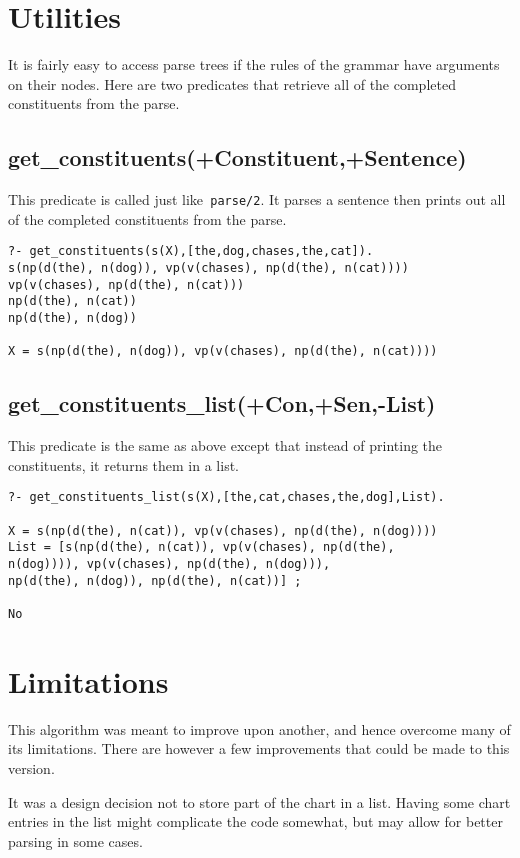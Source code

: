 \documentclass[12pt]{article}
\begin{document}
\section{Utilities}
It is fairly easy to access parse trees if the rules of the grammar have arguments on their nodes.  Here are two predicates that retrieve all of the completed constituents from the parse.

\subsection{get\_constituents(+Constituent,+Sentence)}
This predicate is called just like\verb| parse/2|.  It parses a sentence then prints out all of the completed constituents from the parse.
\begin{verbatim}
?- get_constituents(s(X),[the,dog,chases,the,cat]).
s(np(d(the), n(dog)), vp(v(chases), np(d(the), n(cat))))
vp(v(chases), np(d(the), n(cat)))
np(d(the), n(cat))
np(d(the), n(dog))

X = s(np(d(the), n(dog)), vp(v(chases), np(d(the), n(cat))))
\end{verbatim}

\subsection{get\_constituents\_list(+Con,+Sen,-List)}
This predicate is the same as above except that instead of printing the constituents, it returns them in a list.
\begin{verbatim}
?- get_constituents_list(s(X),[the,cat,chases,the,dog],List).

X = s(np(d(the), n(cat)), vp(v(chases), np(d(the), n(dog))))
List = [s(np(d(the), n(cat)), vp(v(chases), np(d(the),
n(dog)))), vp(v(chases), np(d(the), n(dog))),
np(d(the), n(dog)), np(d(the), n(cat))] ;

No
\end{verbatim}

\section{Limitations}
This algorithm was meant to improve upon another, and hence overcome many of its limitations. There are however a few improvements that could be made to this version.

It was a design decision not to store part of the chart in a list.  Having some chart entries in the list might complicate the code somewhat, but may allow for better parsing in some cases.
\end{document}

